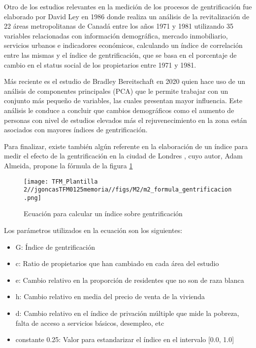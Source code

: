 \documentclass[12pt,a4paper,twoside]{book}
\begin{document}
Otro de los estudios relevantes en la medición de los procesos de gentrificación fue elaborado por David Ley \cite{ley_alternative_1986} en 1986 donde realiza un análisis de la revitalización de 22 áreas metropolitanas de Canadá entre los años 1971 y 1981 utilizando 35 variables relacionadas con información demográfica, mercado inmobiliario, servicios urbanos e indicadores económicos, calculando un índice de correlación entre las mismas y el índice de gentrificación, que se basa en el porcentaje de cambio en el status social de los propietarios entre 1971 y 1981.

Más reciente es el estudio de Bradley Bereitschaft en 2020 \cite{bereitschaft_gentrification_2020} quien hace uso de un análisis de componentes principales (PCA) que le permite trabajar con un conjunto más pequeño de variables, las cuales presentan mayor influencia. Este análisis le conduce a concluir que cambios demográficos como el aumento de personas con nivel de estudios elevados más el rejuvenecimiento en la zona están asociados con mayores índices de gentrificación.

Para finalizar, existe también algún referente en la elaboración de un índice para medir el efecto de la gentrificación en la ciudad de Londres \cite{almeida_pushed_2021}, cuyo autor, Adam Almeida, propone la fórmula de la figura \ref{fig:fig_formula_gentrificacion}

\begin{figure}[h!]
    \centering
    \texttt{[image: TFM\_Plantilla 2//jgoncasTFM0125memoria//figs/M2/m2\_formula\_gentrificacion.png]}
    \caption{Ecuación para calcular un índice sobre gentrificación}
    \label{fig:fig_formula_gentrificacion}
\end{figure}

Los parámetros utilizados en la ecuación son los siguientes:

\begin{itemize}
    \item G: Índice de gentrificación
    \item c: Ratio de propietarios que han cambiado en cada área del estudio
    \item e: Cambio relativo en la proporción de residentes que no son de raza blanca
    \item h: Cambio relativo en media del precio de venta de la vivienda
    \item d: Cambio relativo en el índice de privación múltiple que mide la pobreza, falta de acceso a servicios básicos, desempleo, etc
    \item constante 0.25: Valor para estandarizar el índice en el intervalo [0.0, 1.0]
\end{itemize}
\end{document}
